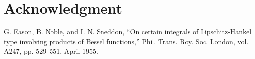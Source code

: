 \documentclass[conference]{IEEEtran}
\begin{document}
\section*{Acknowledgment}


\begin{thebibliography}{00}
 G. Eason, B. Noble, and I. N. Sneddon, ``On certain integrals of Lipschitz-Hankel type involving products of Bessel functions,'' Phil. Trans. Roy. Soc. London, vol. A247, pp. 529--551, April 1955.
\end{thebibliography}
\vspace{12pt}
\end{document}

